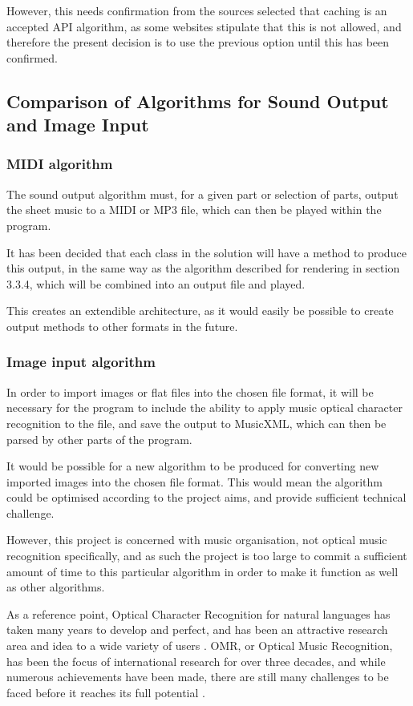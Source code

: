 However, this needs confirmation from the sources selected that caching is an accepted API algorithm, as some websites stipulate that this is not allowed, and therefore the present decision is to use the previous option until this has been confirmed.

\subsection{Comparison of Algorithms for Sound Output and Image Input}
\subsubsection{MIDI algorithm}
The sound output algorithm must, for a given part or selection of parts, output the sheet music to a MIDI or MP3 file, which can then be played within the program. 

It has been decided that each class in the solution will have a method to produce this output, in the same way as the algorithm described for rendering in section 3.3.4, which will be combined into an output file and played.

This creates an extendible architecture, as it would easily be possible to create output methods to other formats in the future.

\subsubsection{Image input algorithm}
In order to import images or flat files into the chosen file format, it will be necessary for the program to include the ability to apply music optical character recognition to the file, and save the output to MusicXML, which can then be parsed by other parts of the program. 

It would be possible for a new algorithm to be produced for converting new imported images into the chosen file format. This would mean the algorithm  could be optimised according to the project aims, and provide sufficient technical challenge.

However, this project is concerned with music organisation, not optical music recognition specifically, and as such the project is too large to commit a sufficient amount of time to this particular algorithm in order to make it function as well as other algorithms. 

As a reference point, Optical Character Recognition for natural languages has taken many years to develop and perfect, and has been an attractive research area and idea to a wide variety of users \parencite{InternationalConf}. OMR, or Optical Music Recognition, has been the focus of international research for over three decades, and while numerous achievements have been made, there are still many challenges to be faced before it reaches its full potential \parencite{musicocr}. 

